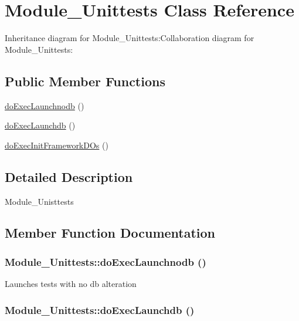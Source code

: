 \hypertarget{classModule__Unittests}{
\section{Module\_\-Unittests Class Reference}
\label{classModule__Unittests}
}
Inheritance diagram for Module\_\-Unittests:Collaboration diagram for Module\_\-Unittests:\subsection*{Public Member Functions}
\begin{CompactItemize}
\item 
\hyperlink{classModule__Unittests_f455f450421da27ea3058682f52ba323}{doExecLaunchnodb} ()
\item 
\hyperlink{classModule__Unittests_d52693ed7860e5b25fb02977902be3ed}{doExecLaunchdb} ()
\item 
\hyperlink{classModule__Unittests_d5b0623b842be1ab385acbd44627dce1}{doExecInitFrameworkDOs} ()
\end{CompactItemize}


\subsection{Detailed Description}
Module\_\-Unisttests 

\subsection{Member Function Documentation}
\hypertarget{classModule__Unittests_f455f450421da27ea3058682f52ba323}{
\subsubsection[doExecLaunchnodb]{\setlength{\rightskip}{0pt plus 5cm}Module\_\-Unittests::doExecLaunchnodb ()}}
\label{classModule__Unittests_f455f450421da27ea3058682f52ba323}


Launches tests with no db alteration \hypertarget{classModule__Unittests_d52693ed7860e5b25fb02977902be3ed}{
\subsubsection[doExecLaunchdb]{\setlength{\rightskip}{0pt plus 5cm}Module\_\-Unittests::doExecLaunchdb ()}}
\label{classModule__Unittests_d52693ed7860e5b25fb02977902be3ed}


